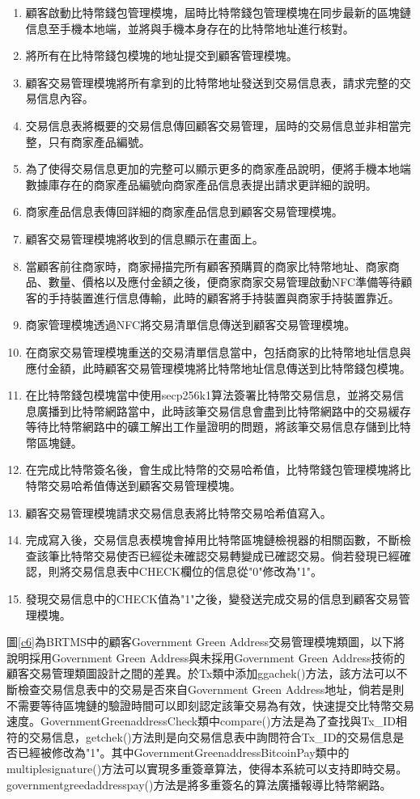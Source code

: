 	\begin{enumerate}
		\item 顧客啟動比特幣錢包管理模塊，屆時比特幣錢包管理模塊在同步最新的區塊鏈信息至手機本地端，並將與手機本身存在的比特幣地址進行核對。
		\item 將所有在比特幣錢包模塊的地址提交到顧客管理模塊。
		\item 顧客交易管理模塊將所有拿到的比特幣地址發送到交易信息表，請求完整的交易信息內容。
		\item 交易信息表將概要的交易信息傳回顧客交易管理，屆時的交易信息並非相當完整，只有商家產品編號。
		\item 為了使得交易信息更加的完整可以顯示更多的商家產品說明，便將手機本地端數據庫存在的商家產品編號向商家產品信息表提出請求更詳細的說明。
		\item 商家產品信息表傳回詳細的商家產品信息到顧客交易管理模塊。
		\item 顧客交易管理模塊將收到的信息顯示在畫面上。
		\item 當顧客前往商家時，商家掃描完所有顧客預購買的商家比特幣地址、商家商品、數量、價格以及應付金額之後，便商家商家交易管理啟動NFC準備等待顧客的手持裝置進行信息傳輸，此時的顧客將手持裝置與商家手持裝置靠近。
		\item 商家管理模塊透過NFC將交易清單信息傳送到顧客交易管理模塊。
		\item 在商家交易管理模塊重送的交易清單信息當中，包括商家的比特幣地址信息與應付金額，此時顧客交易管理模塊將比特幣地址信息傳送到比特幣錢包模塊。
		\item 在比特幣錢包模塊當中使用secp256k1算法簽署比特幣交易信息，並將交易信息廣播到比特幣網路當中，此時該筆交易信息會盡到比特幣網路中的交易緩存等待比特幣網路中的礦工解出工作量證明的問題，將該筆交易信息存儲到比特幣區塊鏈。
		\item 在完成比特幣簽名後，會生成比特幣的交易哈希值，比特幣錢包管理模塊將比特幣交易哈希值傳送到顧客交易管理模塊。
		\item 顧客交易管理模塊請求交易信息表將比特幣交易哈希值寫入。
		\item 完成寫入後，交易信息表模塊會掉用比特幣區塊鏈檢視器的相關函數，不斷檢查該筆比特幣交易使否已經從未確認交易轉變成已確認交易。倘若發現已經確認，則將交易信息表中CHECK欄位的信息從"0"修改為"1"。
		\item 發現交易信息中的CHECK值為"1"之後，變發送完成交易的信息到顧客交易管理模塊。
	\end{enumerate}

	圖\ref{c6}為BRTMS中的顧客Government Green Address交易管理模塊類圖，以下將說明採用Government Green Address與未採用Government Green Address技術的顧客交易管理類圖設計之間的差異。於Tx類中添加ggachek()方法，該方法可以不斷檢查交易信息表中的交易是否來自Government Green Address地址，倘若是則不需要等待區塊鏈的驗證時間可以即刻認定該筆交易為有效，快速提交比特幣交易速度。GovernmentGreenaddressCheck類中compare()方法是為了查找與Tx\_ID相符的交易信息，getchek()方法則是向交易信息表中詢問符合Tx\_ID的交易信息是否已經被修改為"1"。其中GovernmentGreenaddressBitcoinPay類中的multiplesignature()方法可以實現多重簽章算法，使得本系統可以支持即時交易。governmentgreedaddresspay()方法是將多重簽名的算法廣播報導比特幣網路。


